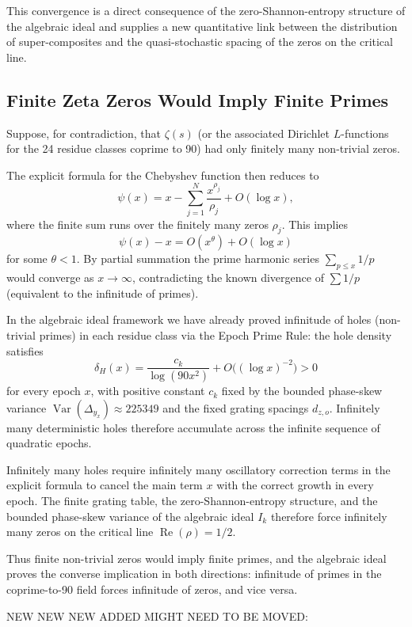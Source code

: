 \documentclass[11pt,a4paper]{article}
\begin{document}
This convergence is a direct consequence of the zero-Shannon-entropy structure of the algebraic ideal and supplies a new quantitative link between the distribution of super-composites and the quasi-stochastic spacing of the zeros on the critical line.

\subsection{Finite Zeta Zeros Would Imply Finite Primes}

Suppose, for contradiction, that \(\zeta(s)\) (or the associated Dirichlet \(L\)-functions for the 24 residue classes coprime to 90) had only finitely many non-trivial zeros.

The explicit formula for the Chebyshev function then reduces to
\[
\psi(x) = x - \sum_{j=1}^{N} \frac{x^{\rho_j}}{\rho_j} + O(\log x),
\]
where the finite sum runs over the finitely many zeros \(\rho_j\). This implies
\[
\psi(x) - x = O(x^{\theta}) + O(\log x)
\]
for some \(\theta < 1\). By partial summation the prime harmonic series \(\sum_{p\le x} 1/p\) would converge as \(x\to\infty\), contradicting the known divergence of \(\sum 1/p\) (equivalent to the infinitude of primes).

In the algebraic ideal framework we have already proved infinitude of holes (non-trivial primes) in each residue class via the Epoch Prime Rule: the hole density satisfies
\[
\delta_H(x) = \frac{c_k}{\log(90x^2)} + O\bigl((\log x)^{-2}\bigr) > 0
\]
for every epoch \(x\), with positive constant \(c_k\) fixed by the bounded phase-skew variance \(\operatorname{Var}(\Delta_{y_x})\approx225349\) and the fixed grating spacings \(d_{z,o}\). Infinitely many deterministic holes therefore accumulate across the infinite sequence of quadratic epochs.

Infinitely many holes require infinitely many oscillatory correction terms in the explicit formula to cancel the main term \(x\) with the correct growth in every epoch. The finite grating table, the zero-Shannon-entropy structure, and the bounded phase-skew variance of the algebraic ideal \(I_k\) therefore force infinitely many zeros on the critical line \(\operatorname{Re}(\rho)=1/2\).

Thus finite non-trivial zeros would imply finite primes, and the algebraic ideal proves the converse implication in both directions: infinitude of primes in the coprime-to-90 field forces infinitude of zeros, and vice versa.

NEW NEW NEW ADDED MIGHT NEED TO BE MOVED:
\end{document}
